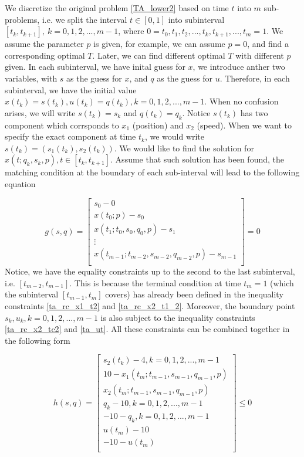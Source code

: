 \documentclass  [
  paper    = a4,
  BCOR     = 10mm,
  twoside,
  fontsize = 12pt,
  fleqn,
  toc      = bibnumbered,
  toc      = listofnumbered,
  numbers  = noendperiod,
  headings = normal,
  listof   = leveldown,
  version  = 3.03
]                                       {scrreprt}
\newcommand{\<}{\langle}
\renewcommand{\>}{\rangle}
\begin{document}
We discretize the original problem \ref{TA_lower2} based on time $t$ into $m$ sub-problems, i.e. we split the interval $t\in [0,1]$ into subinterval $[t_{k}, t_{k+1}],\  k = 0, 1, 2, ..., m-1$, where $0 = t_0, t_1, t_2, ...,t_k, t_{k+1}, ..., t_m = 1$. We assume the parameter $p$ is given, for example, we can assume $p=0$, and find a corresponding optimal $T$. Later, we can find different optimal $T$ with different $p$ given. In each subinterval, we have inital guess for $x$, we introduce anther two variables, with $s$ as the guess for $x$, and $q$ as the guess for $u$. Therefore, in each subinterval, we have the initial value $ x(t_k) = s(t_k), u(t_k) = q(t_k),  k = 0, 1, 2, ..., m-1$. When no confusion arises, we will write $s(t_k) = s_k $ and $q(t_k) = q_k$. Notice $s(t_k)$ has two component which corrsponds to $x_1$ (position) and $x_2$ (speed). When we want to specify the exact component at time $t_k$, we would write $s(t_k) = (s_1(t_k), s_2(t_k))$. We would like to find the solution for $x(t; q_k, s_k, p),  t  \in [t_{k}, t_{k+1}]$. Assume that such solution has been found, the matching condition at the boundary of each sub-interval will lead to the following equation

\begin{equation}
	g(s,q) = \begin{bmatrix}
		s_0 -0 \\
		x(t_0; p) - s_0  \\
		x(t_1; t_0, s_0, q_0, p) - s_1 \\ 
		\vdots \\
		x(t_{m-1}; t_{m-2}, s_{m-2}, q_{m-2}, p) - s_{m-1} \\
	\end{bmatrix} = 0
  \label{TA_eqCons}
\end{equation}
Notice, we have the equality constraints up to the second to the last subinterval, i.e. $[t_{m-2}, t_{m-1}]$. This is because the terminal condition at time $t_m =1$ (which the subinterval $[t_{m-1}, t_m]$ covers) has already been defined in the inequality constraints \ref{ta_rc_x1_t2} and \ref{ta_rc_x2_t1_2}. Moreover, the boundary point $s_k, u_k, k = 0, 1, 2, ..., m-1$ is also subject to the inequality constraints \ref{ta_rc_x2_tc2} and \ref{ta_ut}. All these constraints can be combined together in the following form

\begin{equation}
	h(s,q) = \begin{bmatrix}
		s_2(t_k) - 4, k =0, 1, 2, ..., m-1  \\
		10 - x_1(t_m; t_{m-1}, s_{m-1}, q_{m-1}, p)\\ 
		x_2(t_m; t_{m-1}, s_{m-1}, q_{m-1}, p) \\
		q_k - 10,   k =0, 1, 2, ..., m-1 \\
		-10 - q_k,  k =0, 1, 2, ..., m-1 \\
		u(t_m) - 10 \\
		-10 - u(t_m) \\
	\end{bmatrix} \leq 0
\label{TA_IneqCons}
\end{equation}
\end{document}
